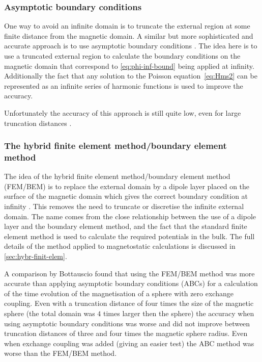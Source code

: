\subsubsection{Asymptotic boundary conditions}
\label{sec:asymptot-bcs}

One way to avoid an infinite domain is to truncate the external region at some finite distance from the magnetic domain.
A similar but more sophisticated and accurate approach is to use asymptotic boundary conditions \cite{Yang1997}.
The idea here is to use a truncated external region to calculate the boundary conditions on the magnetic domain that correspond to \cref{eq:phi-inf-bound} being applied at infinity.
Additionally the fact that any solution to the Poisson equation~\cref{eq:Hms2} can be represented as an infinite series of harmonic functions is used to improve the accuracy.

Unfortunately the accuracy of this approach is still quite low, even for large truncation distances \cite{Bottauscio2008}.


\subsubsection{The hybrid finite element method/boundary element method}
\label{sec:bound-elem-meth}

The idea of the hybrid finite element method/boundary element method (FEM/BEM) is to replace the external domain by a dipole layer placed on the surface of the magnetic domain which gives the correct boundary condition at infinity \cite{Fredkin1990}.
This removes the need to truncate or discretise the infinite external domain.
The name comes from the close relationship between the use of a dipole layer and the boundary element method, and the fact that the standard finite element method is used to calculate the required potentials in the bulk.
The full details of the method applied to magnetostatic calculations is discussed in \cref{sec:hybr-finit-elem}.

A comparison by Bottauscio \cite{Bottauscio2008} found that using the FEM/BEM method was more accurate than applying asymptotic boundary conditions (ABCs) for a calculation of the time evolution of the magnetisation of a sphere with zero exchange coupling.
Even with a truncation distance of four times the size of the magnetic sphere (the total domain was $4$ times larger then the sphere) the accuracy when using asymptotic boundary conditions was worse and did not improve between truncation distances of three and four times the magnetic sphere radius.
Even when exchange coupling was added (giving an easier test) the ABC method was worse than the FEM/BEM method.

